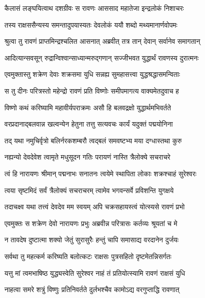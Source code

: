 
\twolineshloka
{कैलासं लङ्घयित्वाथ दशग्रीवः स रावणः}
{आससाद महातेजा इन्द्रलोकं निशाचरः} %

\twolineshloka
{तस्य राक्षससैन्यस्य समन्तादुपयास्यतः}
{देवलोकं ययौ शब्दो मथ्यमानार्णवोपमः} %

\twolineshloka
{श्रुत्वा तु रावणं प्राप्तमिन्द्रश्चलित आसनात्}
{अब्रवीत् तत्र तान् देवान् सर्वानेव समागतान्} %

\twolineshloka
{आदित्यान्सवसून् रुद्रान्विश्वान्साध्यान्मरुद्गणान्}
{सज्जीभवत युद्धार्थं रावणस्य दुरात्मनः} %

\twolineshloka
{एवमुक्तास्तु शक्रेण देवाः शक्रसमा युधि}
{सन्नह्य सुमहासत्त्वा युद्धश्रद्धासमन्विताः} %

\twolineshloka
{स तु दीनः परित्रस्तो महेन्द्रो रावणं प्रति}
{विष्णोः समीपमागत्य वाक्यमेतदुवाच ह} %

\twolineshloka
{विष्णो कथं करिष्यामि महावीर्यपराक्रमः}
{असौ हि बलवद्रक्षो युद्धार्थमभिवर्तते} %

\twolineshloka
{वरप्रदानाद्बलवान्न खल्वन्येन हेतुना}
{तत्तु सत्यवचः कार्यं यदुक्तं पद्मयोनिना} %

\twolineshloka
{तद् यथा नमुचिर्वृत्रो बलिर्नरकशम्बरौ}
{त्वद्बलं समवष्टभ्य मया दग्धास्तथा कुरु} %

\twolineshloka
{नह्यन्यो देवदेवेश त्वामृते मधुसूदन}
{गतिः परायणं नास्ति त्रैलोक्ये सचराचरे} %

\twolineshloka
{त्वं हि नारायणः श्रीमान् पद्मनाभः सनातनः}
{त्वयेमे स्थापिता लोकाः शक्रश्चाहं सुरेश्वरः} %

\twolineshloka
{त्वया सृष्टमिदं सर्वं त्रैलोक्यं सचराचरम्}
{त्वामेव भगवन्सर्वे प्रविशन्ति युगक्षये} %

\twolineshloka
{तदाचक्ष्व यथा तत्त्वं देवदेव मम स्वयम्}
{अपि चक्रसहायस्त्वं योत्स्यसे रावणं प्रभो} %

\twolineshloka
{एवमुक्तः स शक्रेण देवो नारायणः प्रभुः}
{अब्रवीन्न परित्रासः कर्तव्यः श्रूयतां च मे} %

\twolineshloka
{न तावदेष दुष्टात्मा शक्यो जेतुं सुरासुरैः}
{हन्तुं चापि समासाद्य वरदानेन दुर्जयः} %

\twolineshloka
{सर्वथा तु महत्कर्म करिष्यति बलोत्कटः}
{राक्षसः पुत्रसहितो दृष्टमेतन्निसर्गतः} %

\twolineshloka
{यत्तु मां त्वमभाषिष्ठ युद्ध्यस्वेति सुरेश्वर}
{नाहं तं प्रतियोत्स्यामि रावणं राक्षसं युधि} %

\twolineshloka
{नाहत्वा समरे शत्रुं विष्णुः प्रतिनिवर्तते}
{दुर्लभश्चैव कामोऽद्य वरगुप्ताद्धि रावणात्} %

